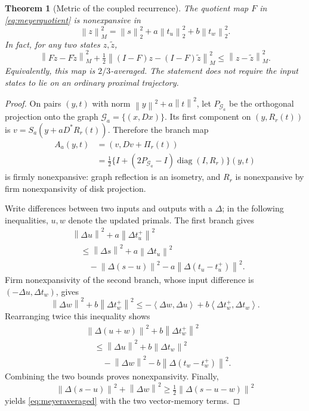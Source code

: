 \documentclass[journal]{IEEEtran}
\newtheorem{theorem}{Theorem}
\theoremstyle{definition}
\newcommand{\norm}[1]{\left\lVert#1\right\rVert}
\newcommand{\ip}[2]{\left\langle#1,#2\right\rangle}
\DeclareMathOperator{\diag}{diag}
\begin{document}
\begin{theorem}[Metric of the coupled recurrence]\label{thm:meyermetric}
The quotient map $F$ in \eqref{eq:meyerquotient} is nonexpansive in
\begin{equation}
 \norm{z}_M^2=\norm{s}_2^2+a\norm{t_u}_2^2+b\norm{t_w}_2^2.
 \label{eq:meyermetric}
\end{equation}
In fact, for any two states $z,\widetilde z$,
\begin{equation}
 \norm{Fz-F\widetilde z}_M^2+
 \tfrac12\norm{(I-F)z-(I-F)\widetilde z}_M^2
 \leq\norm{z-\widetilde z}_M^2. \label{eq:meyeraveraged}
\end{equation}
Equivalently, this map is $2/3$-averaged. The statement does not require
the input states to lie on an ordinary proximal trajectory.
\end{theorem}
\begin{proof}
On pairs $(y,t)$ with norm $\norm{y}^2+a\norm{t}^2$, let $P_{\mathcal G_a}$
be the orthogonal projection onto the graph $\mathcal G_a=\{(x,Dx)\}$.
Its first component on $(y,R_r(t))$ is
$v=S_a(y+aD^*R_r(t))$. Therefore the branch map
\begin{align*}
 A_a(y,t)&=(v,Dv+\Pi_r(t))\\
 &=\tfrac12\{I+(2P_{\mathcal G_a}-I)\diag(I,R_r)\}(y,t)
\end{align*}
is firmly nonexpansive: graph reflection is an isometry, and $R_r$ is
nonexpansive by firm nonexpansivity of disk projection.

Write differences between two inputs and outputs with a $\Delta$; in the
following inequalities, $u,w$ denote the updated primals.
The first branch gives
\begin{align*}
 &\norm{\Delta u}^2+a\norm{\Delta t_u^+}^2\\
 &\quad\leq\norm{\Delta s}^2+a\norm{\Delta t_u}^2\\
 &\qquad-\norm{\Delta(s-u)}^2-a\norm{\Delta(t_u-t_u^+)}^2.
\end{align*}
Firm nonexpansivity of the second branch, whose input difference is
$(-\Delta u,\Delta t_w)$, gives
\[
 \norm{\Delta w}^2+b\norm{\Delta t_w^+}^2
 \leq-\ip{\Delta w}{\Delta u}+b\ip{\Delta t_w^+}{\Delta t_w}.
\]
Rearranging twice this inequality shows
\begin{align*}
 &\norm{\Delta(u+w)}^2+b\norm{\Delta t_w^+}^2\\
 &\quad\leq\norm{\Delta u}^2+b\norm{\Delta t_w}^2\\
 &\qquad-\norm{\Delta w}^2-b\norm{\Delta(t_w-t_w^+)}^2.
\end{align*}
Combining the two bounds proves nonexpansivity. Finally,
\[
 \norm{\Delta(s-u)}^2+\norm{\Delta w}^2
 \geq\tfrac12\norm{\Delta(s-u-w)}^2
\]
yields \eqref{eq:meyeraveraged} with the two vector-memory terms.
\end{proof}
\end{document}
